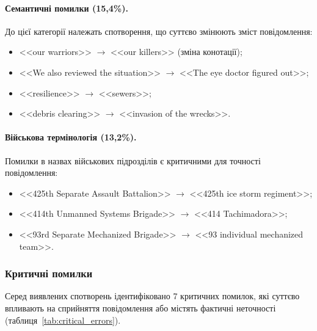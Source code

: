 \paragraph{Семантичні помилки (15,4\%).}
До цієї категорії належать спотворення, що суттєво змінюють зміст повідомлення:
\begin{itemize}[nosep]
    \item <<our warriors>> $\rightarrow$ <<our killers>> (зміна конотації);
    \item <<We also reviewed the situation>> $\rightarrow$ <<The eye doctor figured out>>;
    \item <<resilience>> $\rightarrow$ <<sewers>>;
    \item <<debris clearing>> $\rightarrow$ <<invasion of the wrecks>>.
\end{itemize}

\paragraph{Військова термінологія (13,2\%).}
Помилки в назвах військових підрозділів є критичними для точності повідомлення:
\begin{itemize}[nosep]
    \item <<425th Separate Assault Battalion>> $\rightarrow$ <<425th ice storm regiment>>;
    \item <<414th Unmanned Systems Brigade>> $\rightarrow$ <<414 Tachimadora>>;
    \item <<93rd Separate Mechanized Brigade>> $\rightarrow$ <<93 individual mechanized team>>.
\end{itemize}

\subsubsection{Критичні помилки}

Серед виявлених спотворень ідентифіковано 7 критичних помилок, які суттєво
впливають на сприйняття повідомлення або містять фактичні неточності
(таблиця~\ref{tab:critical_errors}).

